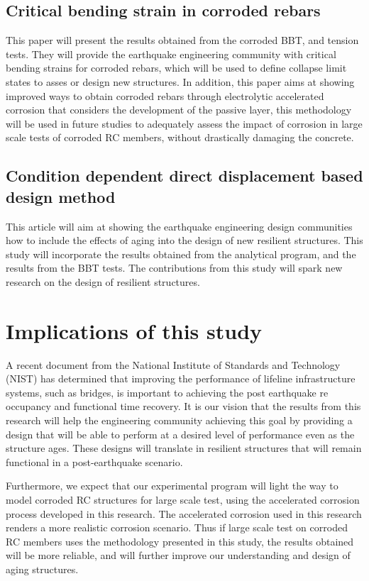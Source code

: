 \subsection{Critical bending strain in corroded rebars}
This paper will present the results obtained from the corroded BBT, and tension tests. They will provide the earthquake engineering community with critical bending strains for corroded rebars, which will be used to define collapse limit states to asses or design new structures. In addition, this paper aims at showing improved ways to obtain corroded rebars through electrolytic accelerated corrosion that considers the development of the passive layer, this methodology will be used in future studies to adequately assess the impact of corrosion in large scale tests of corroded RC members, without drastically damaging the concrete.

\subsection{Condition dependent direct displacement based design method}
This article will aim at showing the earthquake engineering design communities how to include the effects of aging into the design of new resilient structures. This study will incorporate the results obtained from the analytical program, and the results from the BBT tests. The contributions from this study will spark new research on the design of resilient structures.

\section{Implications of this study}

A recent document from the National Institute of Standards and Technology (NIST) \cite{NationalInstituteofStandarsandTechnology2021} has determined that improving the performance of lifeline infrastructure systems, such as bridges, is important to achieving the post earthquake re occupancy and functional time recovery. It is our vision that the results from this research will help the engineering community achieving this goal by providing a design that will be able to perform at a desired level of performance even as the structure ages. These designs will translate in resilient structures that will remain functional in a post-earthquake scenario. 

Furthermore, we expect that our experimental program will light the way to model corroded RC structures for large scale test, using the accelerated corrosion process developed in this research. The accelerated corrosion used in this research renders a more realistic corrosion scenario. Thus if large scale test on corroded RC members uses the methodology presented in this study, the results obtained will be more reliable, and will further improve our understanding and design of aging structures.